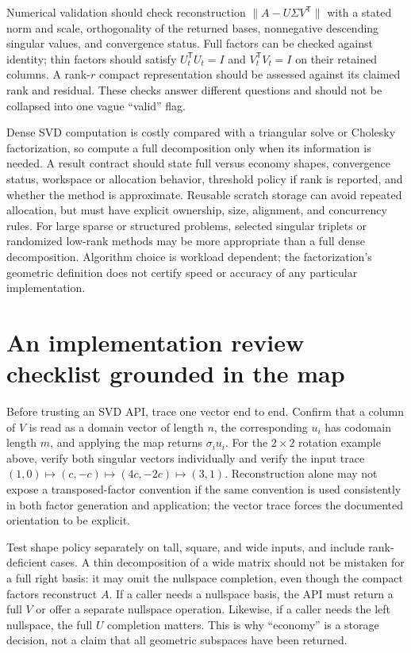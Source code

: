 Numerical validation should check reconstruction \(\|A-U\Sigma V^\mathsf T\|\) with a stated norm and scale, orthogonality of the returned bases, nonnegative descending singular values, and convergence status. Full factors can be checked against identity; thin factors should satisfy \(U_t^\mathsf T U_t=I\) and \(V_t^\mathsf T V_t=I\) on their retained columns. A rank-\(r\) compact representation should be assessed against its claimed rank and residual. These checks answer different questions and should not be collapsed into one vague ``valid'' flag.

Dense SVD computation is costly compared with a triangular solve or Cholesky factorization, so compute a full decomposition only when its information is needed. A result contract should state full versus economy shapes, convergence status, workspace or allocation behavior, threshold policy if rank is reported, and whether the method is approximate. Reusable scratch storage can avoid repeated allocation, but must have explicit ownership, size, alignment, and concurrency rules. For large sparse or structured problems, selected singular triplets or randomized low-rank methods may be more appropriate than a full dense decomposition. Algorithm choice is workload dependent; the factorization's geometric definition does not certify speed or accuracy of any particular implementation.

\section{An implementation review checklist grounded in the map}\label{02-foundations-ii-ch038-an-implementation-review-checklist-grounded-in-the-map}

\hypertarget{02-foundations-ii-ch038-an-implementation-review-checklist-grounded-in-the-map}{}

Before trusting an SVD API, trace one vector end to end. Confirm that a column of \(V\) is read as a domain vector of length \(n\), the corresponding \(u_i\) has codomain length \(m\), and applying the map returns \(\sigma_i u_i\). For the \(2\times2\) rotation example above, verify both singular vectors individually and verify the input trace \((1,0)\mapsto(c,-c)\mapsto(4c,-2c)\mapsto(3,1)\). Reconstruction alone may not expose a transposed-factor convention if the same convention is used consistently in both factor generation and application; the vector trace forces the documented orientation to be explicit.

Test shape policy separately on tall, square, and wide inputs, and include rank-deficient cases. A thin decomposition of a wide matrix should not be mistaken for a full right basis: it may omit the nullspace completion, even though the compact factors reconstruct \(A\). If a caller needs a nullspace basis, the API must return a full \(V\) or offer a separate nullspace operation. Likewise, if a caller needs the left nullspace, the full \(U\) completion matters. This is why ``economy'' is a storage decision, not a claim that all geometric subspaces have been returned.

